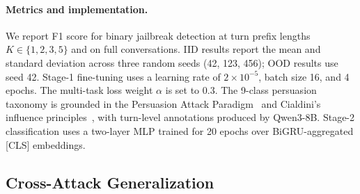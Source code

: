 \paragraph{Metrics and implementation.}
We report F1 score for binary jailbreak detection at turn prefix lengths $K \in \{1, 2, 3, 5\}$ and on full conversations.
IID results report the mean and standard deviation across three random seeds (42, 123, 456); OOD results use seed 42.
Stage-1 fine-tuning uses a learning rate of $2 \times 10^{-5}$, batch size 16, and 4 epochs.
The multi-task loss weight $\alpha$ is set to 0.3.
The 9-class persuasion taxonomy is grounded in the Persuasion Attack Paradigm~\citep{zeng2024pap} and Cialdini's influence principles~\citep{cialdini2001influence}, with turn-level annotations produced by Qwen3-8B.
Stage-2 classification uses a two-layer MLP trained for 20 epochs over BiGRU-aggregated [CLS] embeddings.

\subsection{Cross-Attack Generalization}
\label{sec:cross_attack}

